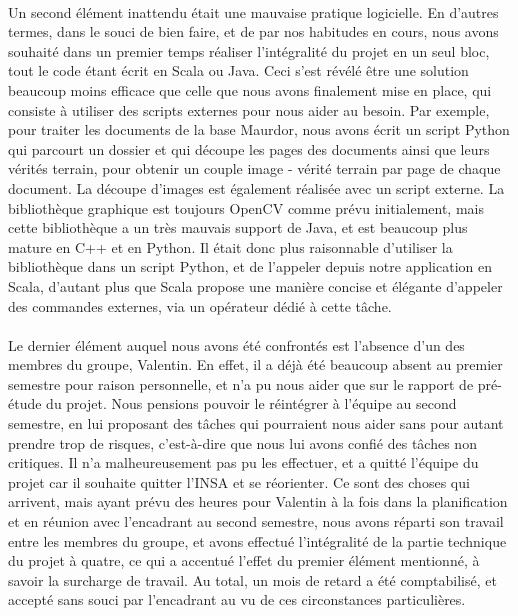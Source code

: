 \paragraph{}
Un second élément inattendu était une mauvaise pratique logicielle. En d'autres termes, dans le souci de bien faire, et de par nos habitudes en cours, nous avons souhaité dans un premier temps réaliser l'intégralité du projet en un seul bloc, tout le code étant écrit en Scala ou Java. Ceci s'est révélé être une solution beaucoup moins efficace que celle que nous avons finalement mise en place, qui consiste à utiliser des scripts externes pour nous aider au besoin. Par exemple, pour traiter les documents de la base Maurdor, nous avons écrit un script Python qui parcourt un dossier et qui découpe les pages des documents ainsi que leurs vérités terrain, pour obtenir un couple image - vérité terrain par page de chaque document. La découpe d'images est également réalisée avec un script externe. La bibliothèque graphique est toujours OpenCV comme prévu initialement, mais cette bibliothèque a un très mauvais support de Java, et est beaucoup plus mature en C++ et en Python. Il était donc plus raisonnable d'utiliser la bibliothèque dans un script Python, et de l'appeler depuis notre application en Scala, d'autant plus que Scala propose une manière concise et élégante d'appeler des commandes externes, via un opérateur dédié à cette tâche.

\paragraph{}
Le dernier élément auquel nous avons été confrontés est l'absence d'un des membres du groupe, Valentin. En effet, il a déjà été beaucoup absent au premier semestre pour raison personnelle, et n'a pu nous aider que sur le rapport de pré-étude du projet. Nous pensions pouvoir le réintégrer à l'équipe au second semestre, en lui proposant des tâches qui pourraient nous aider sans pour autant prendre trop de risques, c'est-à-dire que nous lui avons confié des tâches non critiques. Il n'a malheureusement pas pu les effectuer, et a quitté l'équipe du projet car il souhaite quitter l'INSA et se réorienter. Ce sont des choses qui arrivent, mais ayant prévu des heures pour Valentin à la fois dans la planification et en réunion avec l'encadrant au second semestre, nous avons réparti son travail entre les membres du groupe, et avons effectué l'intégralité de la partie technique du projet à quatre, ce qui a accentué l'effet du premier élément mentionné, à savoir la surcharge de travail. Au total, un mois de retard a été comptabilisé, et accepté sans souci par l'encadrant au vu de ces circonstances particulières.

